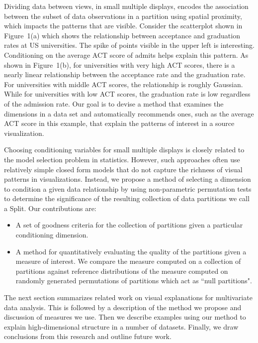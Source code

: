 Dividing data between views, in small multiple displays, encodes the association between the subset of data observations in a partition using spatial proximity, which impacts the patterns that are visible. Consider the scatterplot shown in Figure~1(a) which shows the relationship between acceptance and graduation rates at US universities. The spike of points visible in the upper left is interesting. Conditioning on the average ACT score of admits helps explain this pattern. As shown in Figure~1(b), for universities with very high ACT scores, there is a nearly linear relationship between the acceptance rate and the graduation rate. For universities with middle ACT scores, the relationship is roughly Gaussian. While for universities with low ACT scores, the graduation rate is low regardless of the admission rate. Our goal is to devise a method that examines the dimensions in a data set and automatically recommends ones, such as the average ACT score in this example, that explain the patterns of interest in a source visualization.

Choosing conditioning variables for small multiple displays is closely related to the model selection problem in statistics. However, such approaches often use relatively simple closed form models that do not capture the richness of visual patterns in visualizations. Instead, we propose a method of selecting a dimension to condition a given data relationship by using non-parametric permutation tests to determine the significance of the resulting collection of data partitions we call a Split. Our contributions are:
\begin{itemize}
    \item A set of goodness criteria for the collection of partitions given a particular conditioning dimension.
    \item A method for quantitatively evaluating the quality of the partitions given a measure of interest. We compare the measure computed on a collection of partitions against reference distributions of the measure computed on randomly generated permutations of partitions which act as ``null partitions". 
\end{itemize}

The next section summarizes related work on visual explanations for multivariate data analysis. This is followed by a description of the method we propose and discussion of measures we use. Then we describe examples using our method to explain high-dimensional structure in a number of datasets. Finally, we draw conclusions from this research and outline future work.

